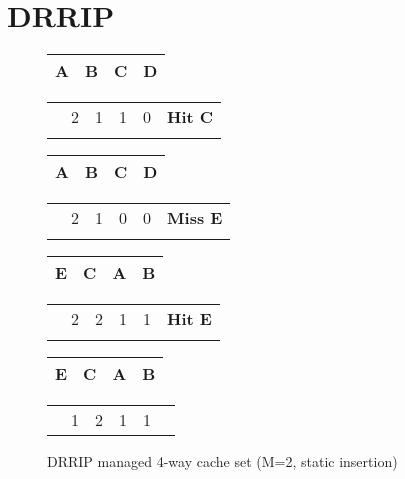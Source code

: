 \section{DRRIP}
\label{sec:background:algorithms:drrip}

\begin{figure}[ht]
    \centering
    \begin{tabular}{|p{2cm}|p{2cm}|p{2cm}|p{2cm}|}
        \hline
        A & B & C & D \\
        \hline
    \end{tabular}
    \begin{tabular}{p{2cm}p{2cm}p{2cm}p{2cm}p{2cm}p{2cm}}
        & 2 & 1 & 1 & 0 & \bf{Hit C} \\
        &   &   &   &   &
    \end{tabular}    

    \begin{tabular}{|p{2cm}|p{2cm}|p{2cm}|p{2cm}|}
        \hline
        A & B & C & D \\
        \hline
    \end{tabular}
    \begin{tabular}{p{2cm}p{2cm}p{2cm}p{2cm}p{2cm}p{2cm}}
        & 2 & 1 & 0 & 0 & \bf{Miss E} \\
        &   &   &   &   &
    \end{tabular}     

    \begin{tabular}{|p{2cm}|p{2cm}|p{2cm}|p{2cm}|}
        \hline
        E & C & A & B \\
        \hline
    \end{tabular}
    \begin{tabular}{p{2cm}p{2cm}p{2cm}p{2cm}p{2cm}p{2cm}}
        & 2 & 2 & 1 & 1 & \bf{Hit E} \\
        &   &   &   &   &
    \end{tabular}    

    \begin{tabular}{|p{2cm}|p{2cm}|p{2cm}|p{2cm}|}
        \hline
        E & C & A & B \\
        \hline
    \end{tabular}
    \begin{tabular}{p{2cm}p{2cm}p{2cm}p{2cm}p{2cm}p{2cm}}
        & 1 & 2 & 1 & 1 & 
    \end{tabular} 

    \caption{DRRIP managed 4-way cache set (M=2, static insertion)}
    \label{fig:background:drrip_example}
\end{figure}

